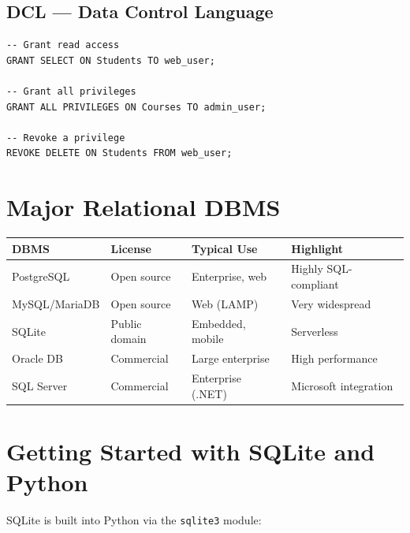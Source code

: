 \subsection{DCL --- Data Control Language}

\begin{codeblock}[title=\textbf{Access Control (PostgreSQL)}]
\begin{verbatim}
-- Grant read access
GRANT SELECT ON Students TO web_user;

-- Grant all privileges
GRANT ALL PRIVILEGES ON Courses TO admin_user;

-- Revoke a privilege
REVOKE DELETE ON Students FROM web_user;
\end{verbatim}
\end{codeblock}

\section{Major Relational DBMS}

\begin{center}
\begin{tabular}{llll}
\toprule
\textbf{DBMS} & \textbf{License} & \textbf{Typical Use} & \textbf{Highlight} \\
\midrule
PostgreSQL & Open source & Enterprise, web & Highly SQL-compliant \\
MySQL/MariaDB & Open source & Web (LAMP) & Very widespread \\
SQLite & Public domain & Embedded, mobile & Serverless \\
Oracle DB & Commercial & Large enterprise & High performance \\
SQL Server & Commercial & Enterprise (.NET) & Microsoft integration \\
\bottomrule
\end{tabular}
\end{center}

\section{Getting Started with SQLite and Python}

SQLite is built into Python via the \texttt{sqlite3} module:

